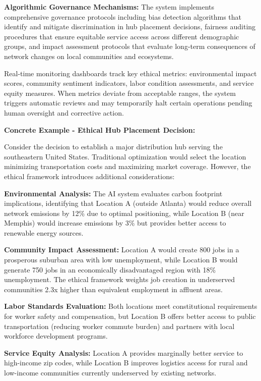 \documentclass{article}
\begin{document}
\textbf{Algorithmic Governance Mechanisms:}
The system implements comprehensive governance protocols including bias detection algorithms that identify and mitigate discrimination in hub placement decisions, fairness auditing procedures that ensure equitable service access across different demographic groups, and impact assessment protocols that evaluate long-term consequences of network changes on local communities and ecosystems.

Real-time monitoring dashboards track key ethical metrics: environmental impact scores, community sentiment indicators, labor condition assessments, and service equity measures. When metrics deviate from acceptable ranges, the system triggers automatic reviews and may temporarily halt certain operations pending human oversight and corrective action.

\textbf{Concrete Example - Ethical Hub Placement Decision:}

Consider the decision to establish a major distribution hub serving the southeastern United States. Traditional optimization would select the location minimizing transportation costs and maximizing market coverage. However, the ethical framework introduces additional considerations:

\textbf{Environmental Analysis:} The AI system evaluates carbon footprint implications, identifying that Location A (outside Atlanta) would reduce overall network emissions by 12\% due to optimal positioning, while Location B (near Memphis) would increase emissions by 3\% but provides better access to renewable energy sources.

\textbf{Community Impact Assessment:} Location A would create 800 jobs in a prosperous suburban area with low unemployment, while Location B would generate 750 jobs in an economically disadvantaged region with 18\% unemployment. The ethical framework weights job creation in underserved communities 2.3x higher than equivalent employment in affluent areas.

\textbf{Labor Standards Evaluation:} Both locations meet constitutional requirements for worker safety and compensation, but Location B offers better access to public transportation (reducing worker commute burden) and partners with local workforce development programs.

\textbf{Service Equity Analysis:} Location A provides marginally better service to high-income zip codes, while Location B improves logistics access for rural and low-income communities currently underserved by existing networks.
\end{document}
